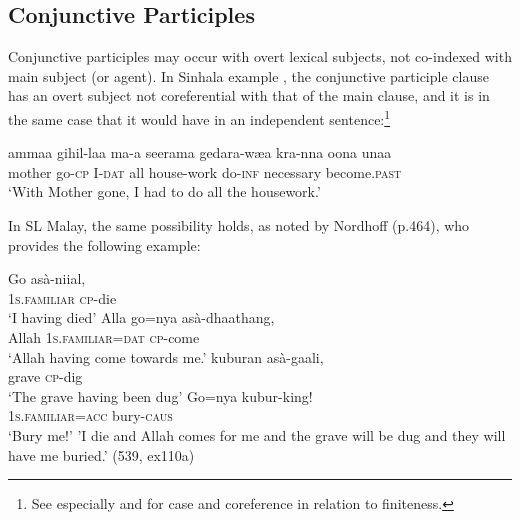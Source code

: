 \subsection{Conjunctive Participles}\label{gair:sec:3.8}


Conjunctive participles may occur with overt lexical subjects, not co-indexed with main subject (or agent). 
 In Sinhala example , the conjunctive participle clause has an overt subject not coreferential with that of the main clause, and it is in the same case that it would have in an independent sentence:\footnote{See
  especially \citet{Gair2005} and \citet{McFaddenEtAl2010} for case and coreference in relation to finiteness.
}


\ea\label{ex3.8.1} 
\gll ammaa gihil-laa ma-{\dott}a seerama gedara-w{\ae}{\dotd}a k{\E}ra-nna oona unaa\\
     mother go-\textsc{cp} I-\textsc{dat} all  house-work  do-\textsc{inf}  necessary become.\textsc{past} \\
   `With Mother gone, I had to do all the housework.'  
\z

 In SL Malay, the same possibility holds, as noted by Nordhoff (p.464), who provides the following example: 


\ea\label{ex3.8.2} 
\ea
\gll Go asà-nii{\ung}al,\\
  1\textsc{s.familiar} \textsc{cp}-die\\
  `I having died'
\ex  
\gll Alla go=nya  asà-dhaathang,\\
  Allah  1\textsc{s.familiar}=\textsc{dat} \textsc{cp}-come\\
  `Allah having come towards me.'
\ex  
\gll kuburan asà-gaali,\\
  grave \textsc{cp}-dig\\
  `The grave having been dug'
\ex 
\gll Go=nya  kubur-king!\\
  1\textsc{s.familiar}=\textsc{acc} bury-\textsc{caus}\\
  `Bury me!'
'I die and Allah comes for me and the grave will be dug and they will have
 me buried.' (539, ex110a)
\z
\z



